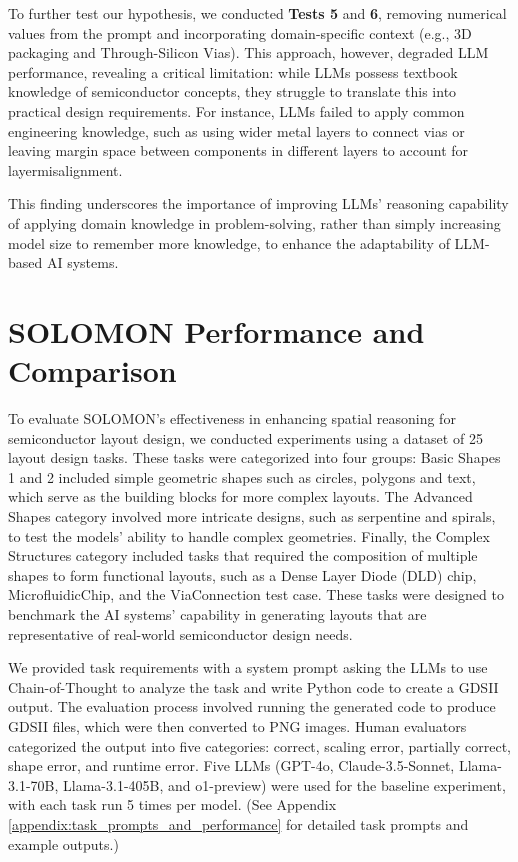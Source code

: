 \documentclass{article}
\begin{document}
To further test our hypothesis, we conducted \textbf{Tests 5} and \textbf{6}, removing numerical values from the prompt and incorporating domain-specific context (e.g., 3D packaging and Through-Silicon Vias). This approach, however, degraded LLM performance, revealing a critical limitation: while LLMs possess textbook knowledge of semiconductor concepts, they struggle to translate this into practical design requirements. For instance, LLMs failed to apply common engineering knowledge, such as using wider metal layers to connect vias or leaving margin space between components in different layers to account for layermisalignment.

This finding underscores the importance of improving LLMs' reasoning capability of applying domain knowledge in problem-solving, rather than simply increasing model size to remember more knowledge, to enhance the adaptability of LLM-based AI systems.

\section{SOLOMON Performance and Comparison}
\label{sec:evaluation}
To evaluate SOLOMON's effectiveness in enhancing spatial reasoning for semiconductor layout design, we conducted experiments using a dataset of 25 layout design tasks. These tasks were categorized into four groups: Basic Shapes 1 and 2 included simple geometric shapes such as circles, polygons and text, which serve as the building blocks for more complex layouts. The Advanced Shapes category involved more intricate designs, such as serpentine and spirals, to test the models' ability to handle complex geometries. Finally, the Complex Structures category included tasks that required the composition of multiple shapes to form functional layouts, such as a Dense Layer Diode (DLD) chip, MicrofluidicChip, and the ViaConnection test case. These tasks were designed to benchmark the AI systems' capability in generating layouts that are representative of real-world semiconductor design needs.

We provided task requirements with a system prompt asking the LLMs to use Chain-of-Thought to analyze the task and write Python code to create a GDSII output. The evaluation process involved running the generated code to produce GDSII files, which were then converted to PNG images. Human evaluators categorized the output into five categories: correct, scaling error, partially correct, shape error, and runtime error. Five LLMs (GPT-4o, Claude-3.5-Sonnet, Llama-3.1-70B, Llama-3.1-405B, and o1-preview) were used for the baseline experiment, with each task run 5 times per model. (See Appendix \ref{appendix:task_prompts_and_performance} for detailed task prompts and example outputs.)
\end{document}
